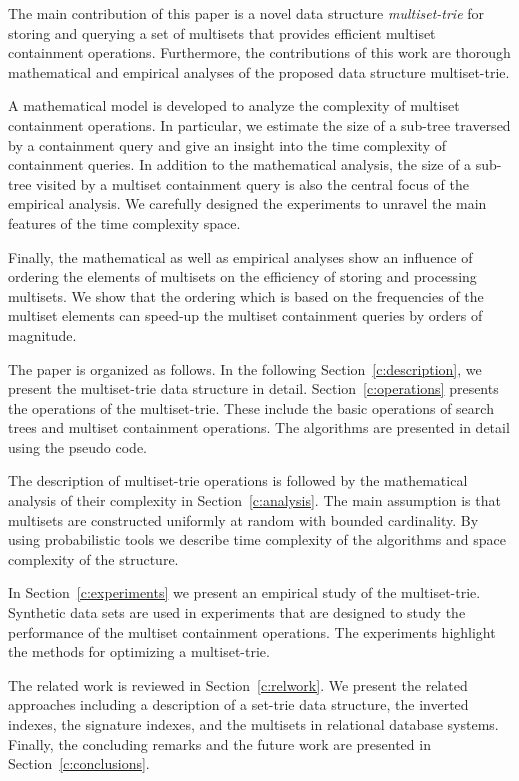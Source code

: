 The main contribution of this paper is a novel data structure \emph{multiset-trie} for storing and querying a set of multisets that provides efficient multiset containment operations. Furthermore, the contributions of this work are thorough mathematical and empirical analyses of the proposed data structure multiset-trie. 

A mathematical model is developed to analyze the complexity of multiset containment operations. In particular, we estimate the size of a sub-tree traversed by a containment query and give an insight into the time complexity of containment queries. 
In addition to the mathematical analysis, the size of a sub-tree visited by a multiset containment query is also the central focus of the empirical analysis. We carefully designed the experiments to unravel the main features of the time complexity space. 

Finally, the mathematical as well as empirical analyses show an influence of ordering the elements of multisets on the efficiency of storing and processing multisets. We show that the ordering which is based on the frequencies of the multiset elements can speed-up the multiset containment queries by orders of magnitude.

The paper is organized as follows. In the following Section~\ref{c:description}, we present the multiset-trie data structure in detail.
Section~\ref{c:operations} presents the operations of the multiset-trie. These include the basic operations of search trees and multiset containment operations. The algorithms are presented in detail using the pseudo code. 

The description of multiset-trie operations is followed by the mathematical analysis of their complexity in Section~\ref{c:analysis}. The main assumption is that multisets are constructed uniformly at random with bounded cardinality. By using probabilistic tools we describe time complexity of the algorithms and space complexity of the structure.

In Section~\ref{c:experiments} we present an empirical study of the multiset-trie. Synthetic data sets are used in experiments that are designed to study the performance of the multiset containment operations. The experiments highlight the methods for optimizing a multiset-trie. 

The related work is reviewed in Section~\ref{c:relwork}. We present the related approaches including a description of a set-trie data structure, the inverted indexes, the signature indexes, and the multisets in relational database systems. Finally, the concluding remarks and the future work are presented in Section~\ref{c:conclusions}.


